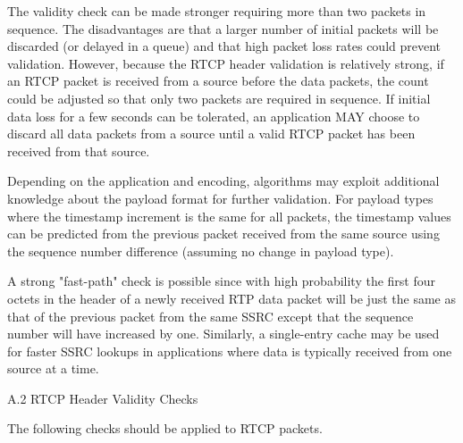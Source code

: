 \documentclass{article}
\begin{document}
\begin{itemize}
The validity check can be made stronger requiring more than two packets in sequence.  The disadvantages are that a larger number of initial packets will be discarded (or delayed in a queue) and that high packet loss rates could prevent validation.  However, because the RTCP header validation is relatively strong, if an RTCP packet is received from a source before the data packets, the count could be adjusted so that only two packets are required in sequence.  If initial data loss for a few seconds can be tolerated, an application MAY choose to discard all data packets from a source until a valid RTCP packet has been received from that source.

Depending on the application and encoding, algorithms may exploit additional knowledge about the payload format for further validation. For payload types where the timestamp increment is the same for all packets, the timestamp values can be predicted from the previous packet received from the same source using the sequence number difference (assuming no change in payload type).

A strong "fast-path" check is possible since with high probability the first four octets in the header of a newly received RTP data packet will be just the same as that of the previous packet from the same SSRC except that the sequence number will have increased by one. Similarly, a single-entry cache may be used for faster SSRC lookups in applications where data is typically received from one source at a time.

\end{itemize}
A.2 RTCP Header Validity Checks

The following checks should be applied to RTCP packets.
\end{document}
